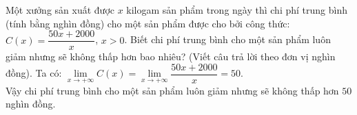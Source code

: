 \begin{ex}%
	Một xưởng sản xuất được $x$ kilogam sản phẩm trong ngày thì chi phí trung bình (tính bằng nghìn đồng) cho một sản phẩm được cho bởi công thức: $C(x)=\dfrac{50x+2000}{x}$, $x>0$. Biết chi phí trung bình cho một sản phẩm luôn giảm nhưng sẽ không thấp hơn bao nhiêu? (Viết câu trả lời theo đơn vị nghìn đồng).
	\loigiai
	{Ta có: $\lim\limits_{x\to +\infty} C(x)=\lim\limits_{x\to +\infty}\dfrac{50x+2000}{x}=50$.\\
		Vậy chi phí trung bình cho một sản phẩm luôn giảm nhưng sẽ không thấp hơn $50$ nghìn đồng.
	}
\end{ex}


